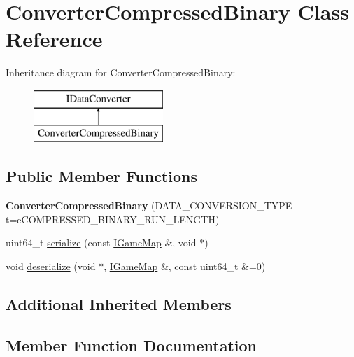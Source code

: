 \hypertarget{class_converter_compressed_binary}{}\section{Converter\+Compressed\+Binary Class Reference}
\label{class_converter_compressed_binary}
Inheritance diagram for Converter\+Compressed\+Binary\+:\begin{figure}[H]
\begin{center}
\leavevmode
\includegraphics[height=2.000000cm]{class_converter_compressed_binary}
\end{center}
\end{figure}
\subsection*{Public Member Functions}
\begin{DoxyCompactItemize}
\item 
\hypertarget{class_converter_compressed_binary_a9f45ab7b6c3c759037a5d6521b157be9}{}{\bfseries Converter\+Compressed\+Binary} (D\+A\+T\+A\+\_\+\+C\+O\+N\+V\+E\+R\+S\+I\+O\+N\+\_\+\+T\+Y\+P\+E t=e\+C\+O\+M\+P\+R\+E\+S\+S\+E\+D\+\_\+\+B\+I\+N\+A\+R\+Y\+\_\+\+R\+U\+N\+\_\+\+L\+E\+N\+G\+T\+H)\label{class_converter_compressed_binary_a9f45ab7b6c3c759037a5d6521b157be9}

\item 
uint64\+\_\+t \hyperlink{class_converter_compressed_binary_a3b33aed8606972db9860d24e146b6aaf}{serialize} (const \hyperlink{class_i_game_map}{I\+Game\+Map} \&, void $\ast$)
\item 
void \hyperlink{class_converter_compressed_binary_a5cb711ee34a1bf170349424b478c6c41}{deserialize} (void $\ast$, \hyperlink{class_i_game_map}{I\+Game\+Map} \&, const uint64\+\_\+t \&=0)
\end{DoxyCompactItemize}
\subsection*{Additional Inherited Members}


\subsection{Member Function Documentation}
\hypertarget{class_converter_compressed_binary_a5cb711ee34a1bf170349424b478c6c41}{}
